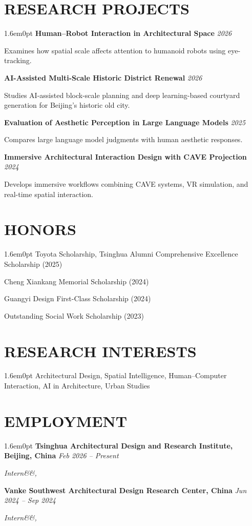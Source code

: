 \documentclass[11.5pt,letterpaper]{article}
\newlength{\ItemGap}
\newenvironment{cvcontent}
  {\begin{adjustwidth}{1.6em}{0pt}}
  {\end{adjustwidth}}
\newcommand{\entry}[4]{%
  \textbf{#1} \hfill \textit{#2}\par
  \textit{#3\ifx&#4&\else, #4\fi}\par
  \vspace{\ItemGap}
}
\newcommand{\project}[3]{%
  \textbf{#1} \hfill \textit{#2}\par
  #3\par
  \vspace{\ItemGap}
}
\newcommand{\award}[1]{%
  #1\par
  \vspace{\ItemGap}
}
\begin{document}
\section*{RESEARCH PROJECTS}
\begin{cvcontent}
\project
{Human--Robot Interaction in Architectural Space}
{2026}
{Examines how spatial scale affects attention to humanoid robots using eye-tracking.}

\project
{AI-Assisted Multi-Scale Historic District Renewal}
{2026}
{Studies AI-assisted block-scale planning and deep learning-based courtyard generation for Beijing's historic old city.}

\project
{Evaluation of Aesthetic Perception in Large Language Models}
{2025}
{Compares large language model judgments with human aesthetic responses.}

\project
{Immersive Architectural Interaction Design with CAVE Projection}
{2024}
{Develops immersive workflows combining CAVE systems, VR simulation, and real-time spatial interaction.}
\end{cvcontent}

\section*{HONORS}
\begin{cvcontent}
\award{Toyota Scholarship, Tsinghua Alumni Comprehensive Excellence Scholarship (2025)}
\award{Cheng Xiankang Memorial Scholarship (2024)}
\award{Guangyi Design First-Class Scholarship (2024)}
\award{Outstanding Social Work Scholarship (2023)}
\end{cvcontent}

\section*{RESEARCH INTERESTS}
\begin{cvcontent}
Architectural Design, Spatial Intelligence, Human--Computer Interaction, AI in Architecture, Urban Studies
\end{cvcontent}

\section*{EMPLOYMENT}
\begin{cvcontent}
\entry
{Tsinghua Architectural Design and Research Institute, Beijing, China}
{Feb 2026 -- Present}
{Intern}
{}

\entry
{Vanke Southwest Architectural Design Research Center, China}
{Jun 2024 -- Sep 2024}
{Intern}
{}
\end{cvcontent}
\end{document}
